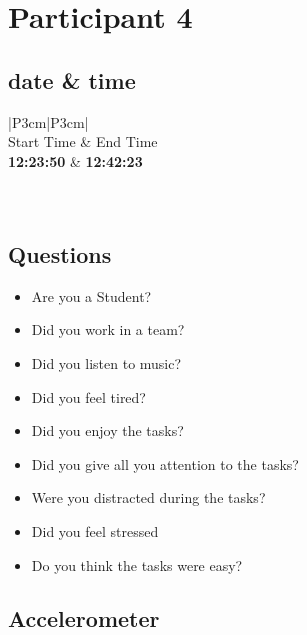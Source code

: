 \section{Participant 4}

\subsection{date \& time}
\begin{table}[ht]
  \begin{tabular}{|P{3cm}|P{3cm}|}
	    	\\ \hline
    Start Time      			& End Time   					\\ \hline
   \textbf{12:23:50} 	& \textbf{12:42:23}    	\\ \hline
       						\\ \hline
    			\\ \hline
  \end{tabular}
  \newline\newline
  \caption{title}\label{tab1}
\end{table}

\subsection{Questions}
\begin{itemize} 
  \item[\XSolidBrush] Are you a Student?
  \item[\Checkmark] Did you work in a team?
  \item[\Checkmark] Did you listen to music?
  \item[\XSolidBrush] Did you feel tired?
  \item[\Checkmark] Did you enjoy the tasks?
  \item[\Checkmark] Did you give all you attention to the tasks?
  \item[\XSolidBrush] Were you distracted during the tasks?
  \item[\XSolidBrush] Did you feel stressed
  \item[\Checkmark] Do you think the tasks were easy?  
\end{itemize}


\FloatBarrier
\newpage
\subsection{Accelerometer}

